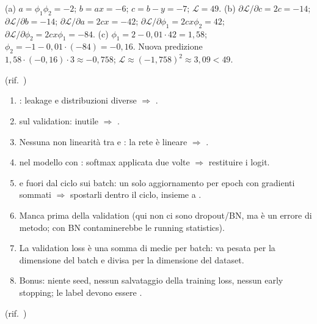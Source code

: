 \begin{soluzione}
(a) $a = \phi_1\phi_2 = -2$; $b = ax = -6$; $c = b - y = -7$; $\mathcal{L} = 49$.
(b) $\partial\mathcal{L}/\partial c = 2c = -14$; $\partial\mathcal{L}/\partial b = -14$; $\partial\mathcal{L}/\partial a = 2cx = -42$;
$\partial\mathcal{L}/\partial\phi_1 = 2cx\phi_2 = 42$; $\partial\mathcal{L}/\partial\phi_2 = 2cx\phi_1 = -84$.
(c) $\phi_1 = 2 - 0{,}01\cdot42 = 1{,}58$; $\phi_2 = -1 - 0{,}01\cdot(-84) = -0{,}16$. Nuova predizione $1{,}58\cdot(-0{,}16)\cdot3 \approx -0{,}758$;
$\mathcal{L} \approx (-1{,}758)^2 \approx 3{,}09 < 49$.

(rif.\ )
\end{soluzione}

\begin{soluzione}
\begin{enumerate}
  \item {}: leakage e distribuzioni diverse $\Rightarrow$ .
  \item {} sul validation: inutile $\Rightarrow$ .
  \item Nessuna non linearità tra  e : la rete è lineare $\Rightarrow$ .
  \item {} nel modello con : softmax applicata due volte $\Rightarrow$ restituire i logit.
  \item {} e  fuori dal ciclo sui batch: un solo aggiornamento per epoch con gradienti sommati
        $\Rightarrow$ spostarli dentro il ciclo, insieme a .
  \item Manca  prima della validation (qui non ci sono dropout/BN, ma è un errore di metodo; con BN contaminerebbe le
        running statistics).
  \item La validation loss è una somma di medie per batch: va pesata per la dimensione del batch e divisa per la dimensione del dataset.
  \item Bonus: niente seed, nessun salvataggio della training loss, nessun early stopping; le label devono essere .
\end{enumerate}

(rif.\ )
\end{soluzione}

